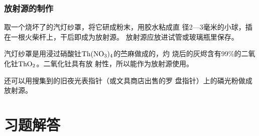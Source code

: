 \subsubsection{放射源的制作}

取一个烧坏了的汽灯纱罩，将它研成粉末，用胶水粘成直
径2—3毫米的小球，插在一根火柴杆上，干后即成为放射源。
放射源应放进试管或玻璃瓶里保存。

汽灯纱罩是用浸过硝酸钍$\rm Th(NO_3)_4$的苎麻做成的，灼
烧后的灰烬含有99\%的二氧化钍$\rm ThO_2$。二氧化钍具有放
射性，所以能作为放射源使用。

还可以用搜集到的旧夜光表指针（或文具商店出售的罗
盘指针）上的磷光粉做成放射源。


\section{习题解答}


